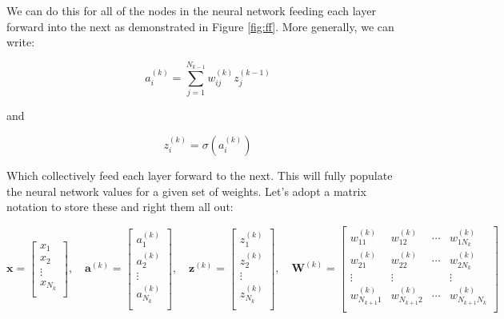 \documentclass{article}
\begin{document}
We can do this for all of the nodes in the neural network feeding each layer forward into the next as demonstrated in Figure \ref{fig:ff}. More generally, we can write:

\begin{equation}
    a_i^{(k)} = \sum_{j=1}^{N_{k-1}} w_{ij}^{(k)} z_j^{(k-1)} 
\end{equation}

and

\begin{equation}
    z_i^{(k)} = \sigma(a_i^{(k)})
\end{equation}

Which collectively feed each layer forward to the next. This will fully populate the neural network values for a given set of weights. Let's adopt a matrix notation to store these and right them all out:

\begin{equation}
\mathbf{x} = 
    \begin{bmatrix}
        x_{1}\\
        x_{2}\\
        \vdots\\
        x_{N_{k}}\\
    \end{bmatrix}, \quad
    \mathbf{a}^{(k)} = 
    \begin{bmatrix}
        a_1^{(k)}\\
        a_2^{(k)}\\
        \vdots\\
        a_{N_k}^{(k)}\\
    \end{bmatrix}, \quad
    \mathbf{z}^{(k)} = 
    \begin{bmatrix}
        z_1^{(k)}\\
        z_2^{(k)}\\
        \vdots\\
        z_{N_k}^{(k)}\\
    \end{bmatrix}, \quad
    \mathbf{W}^{(k)} = 
    \begin{bmatrix}
        w_{11}^{(k)} & w_{12}^{(k)} & \cdots & w_{1 N_k}^{(k)}\\[2ex]
        w_{21}^{(k)} & w_{22}^{(k)} & \cdots & w_{2 N_k}^{(k)}\\[2ex]
        \vdots & \vdots &  & \vdots\\[2ex]
        w_{N_{k+1} 1}^{(k)} & w_{N_{k+1} 2}^{(k)} & \cdots & w_{N_{k+1} N_k }^{(k)}\\[2ex]
    \end{bmatrix}
\end{equation}
\end{document}
